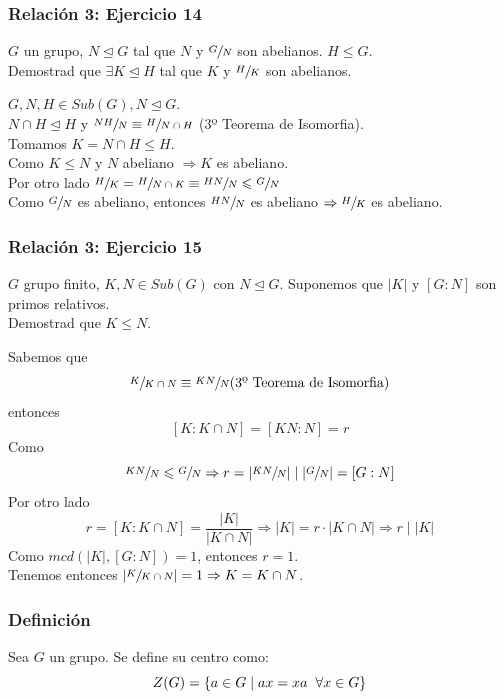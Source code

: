 \documentclass[11pt,a4paper]{article}
\begin{document}
\subsubsection*{Relación 3: Ejercicio 14}

$G$ un grupo, $N \unlhd G$ tal que $N$ y $\sfrac{G}{N}$ son abelianos. $H \leqslant G$. \\
Demostrad que $\exists K \unlhd H$ tal que $K$ y $\sfrac{H}{K}$ son abelianos.

$G, N, H \in Sub(G), N \unlhd G$. \\
$N \cap H \unlhd H$ y $\sfrac{NH}{N} \equiv \sfrac{H}{N \cap H}$ (3º Teorema de Isomorfia). \\
Tomamos $K = N \cap H \leqslant H$. \\
Como $K \leqslant N$ y $N$ abeliano $\Rightarrow K$ es abeliano. \\
Por otro lado $\sfrac{H}{K} = \sfrac{H}{N \cap K} \equiv \sfrac{HN}{N} \leqslant \sfrac{G}{N}$ \\
Como $\sfrac{G}{N}$ es abeliano, entonces $\sfrac{HN}{N}$ es abeliano $\Rightarrow \sfrac{H}{K}$ es abeliano.

\subsubsection*{Relación 3: Ejercicio 15}

$G$ grupo finito, $K, N \in Sub(G)$ con $N \unlhd G$. Suponemos que $|K|$ y $[G:N]$ son primos relativos. \\
Demostrad que $K \leqslant N$.

Sabemos que
$$\sfrac{K}{K \cap N} \equiv \sfrac{KN}{N} (\text{3º Teorema de Isomorfia)}$$
entonces
$$[K : K \cap N] = [KN : N] = r$$
Como
$$\sfrac{KN}{N} \leqslant \sfrac{G}{N} \Rightarrow r = |\sfrac{KN}{N}| \mid |\sfrac{G}{N}| = [G:N]$$
Por otro lado
$$r = [K:K \cap N] = \frac{|K|}{|K \cap N|} \Rightarrow |K| = r \cdot |K \cap N| \Rightarrow r \mid |K|$$
Como $mcd(|K|, [G:N]) = 1$, entonces $r = 1$. \\
Tenemos entonces $|\sfrac{K}{K \cap N}| = 1 \Rightarrow K = K \cap N$.


\subsubsection*{Definición}

Sea $G$ un grupo. Se define su centro como:
$$Z(G) = \{a \in G \mid ax = xa \hspace{0.2cm} \forall x \in G\}$$
\end{document}
